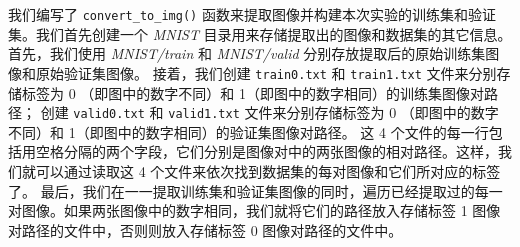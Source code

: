 \documentclass[supercite]{Experimental_Report}
\theoremstyle{definition}
\begin{document}
我们编写了 \texttt{convert\_to\_img()} 函数来提取图像并构建本次实验的训练集和验证集。我们首先创建一个 \emph{MNIST} 目录用来存储提取出的图像和数据集的其它信息。
首先，我们使用 \emph{MNIST/train} 和 \emph{MNIST/valid} 分别存放提取后的原始训练集图像和原始验证集图像。
接着，我们创建 \texttt{train0.txt} 和 \texttt{train1.txt} 文件来分别存储标签为 0 （即图中的数字不同）和 1（即图中的数字相同）的训练集图像对路径；
创建 \texttt{valid0.txt} 和 \texttt{valid1.txt} 文件来分别存储标签为 0 （即图中的数字不同）和 1（即图中的数字相同）的验证集图像对路径。
这 4 个文件的每一行包括用空格分隔的两个字段，它们分别是图像对中的两张图像的相对路径。这样，我们就可以通过读取这 4 个文件来依次找到数据集的每对图像和它们所对应的标签了。
最后，我们在一一提取训练集和验证集图像的同时，遍历已经提取过的每一对图像。如果两张图像中的数字相同，我们就将它们的路径放入存储标签 1 图像对路径的文件中，否则则放入存储标签 0 图像对路径的文件中。
\end{document}
